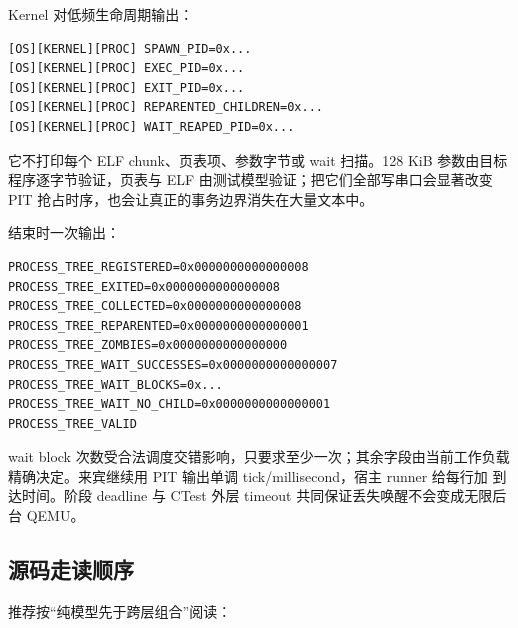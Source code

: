 Kernel 对低频生命周期输出：

\begin{lstlisting}[caption={v1.7 进程生命周期日志}]
[OS][KERNEL][PROC] SPAWN_PID=0x...
[OS][KERNEL][PROC] EXEC_PID=0x...
[OS][KERNEL][PROC] EXIT_PID=0x...
[OS][KERNEL][PROC] REPARENTED_CHILDREN=0x...
[OS][KERNEL][PROC] WAIT_REAPED_PID=0x...
\end{lstlisting}

它不打印每个 ELF chunk、页表项、参数字节或 wait 扫描。128 KiB 参数由目标
程序逐字节验证，页表与 ELF 由测试模型验证；把它们全部写串口会显著改变 PIT
抢占时序，也会让真正的事务边界消失在大量文本中。

结束时一次输出：

\begin{lstlisting}[caption={正常八进程树的精确摘要}]
PROCESS_TREE_REGISTERED=0x0000000000000008
PROCESS_TREE_EXITED=0x0000000000000008
PROCESS_TREE_COLLECTED=0x0000000000000008
PROCESS_TREE_REPARENTED=0x0000000000000001
PROCESS_TREE_ZOMBIES=0x0000000000000000
PROCESS_TREE_WAIT_SUCCESSES=0x0000000000000007
PROCESS_TREE_WAIT_BLOCKS=0x...
PROCESS_TREE_WAIT_NO_CHILD=0x0000000000000001
PROCESS_TREE_VALID
\end{lstlisting}

wait block 次数受合法调度交错影响，只要求至少一次；其余字段由当前工作负载
精确决定。来宾继续用 PIT 输出单调 tick/millisecond，宿主 runner 给每行加
\code{[QEMU][T+...ms]} 到达时间。阶段 deadline 与 CTest 外层 timeout
共同保证丢失唤醒不会变成无限后台 QEMU。

\subsection{源码走读顺序}

推荐按“纯模型先于跨层组合”阅读：

